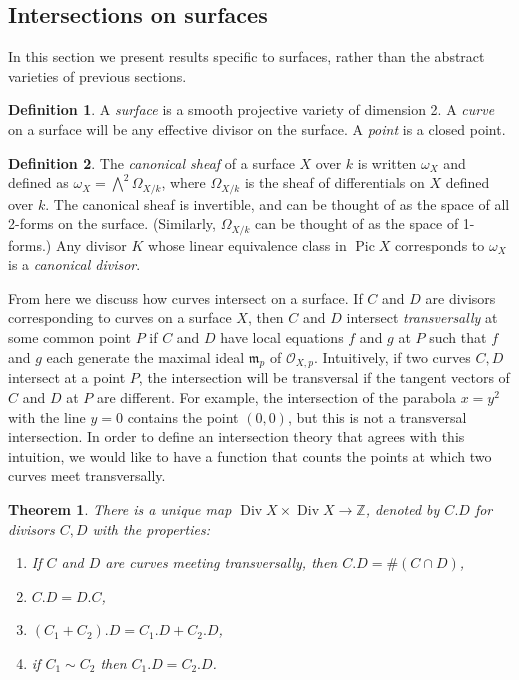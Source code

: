 \documentclass[12pt,twoside]{reedthesis}
\theoremstyle{plain}
\newtheorem{theorem}{Theorem}[chapter]
\theoremstyle{definition}
\newtheorem{definition}{Definition}[section]
\theoremstyle{remark}
\newcommand{\ZZ}{\mathbb{Z}}
\newcommand{\calO}{\mathcal{O}}
\newcommand{\Div}{\operatorname{Div}}
\newcommand{\Pic}{\operatorname{Pic}}
\begin{document}
\subsection{Intersections on surfaces}
In this section we present results specific to surfaces, rather than the abstract varieties of previous sections.
\begin{definition}
A \emph{surface} is a smooth projective variety of dimension 2. A \emph{curve} on a surface will be any effective divisor on the surface. A \emph{point} is a closed point.
\end{definition}
\begin{definition}
The \emph{canonical sheaf} of a surface $X$ over $k$ is written $\omega_X$ and defined as $\omega_X=\bigwedge^2\Omega_{X/k}$, where $\Omega_{X/k}$ is the sheaf of differentials on $X$ defined over $k$. The canonical sheaf is invertible, and can be thought of as the space of all 2-forms on the surface. (Similarly, $\Omega_{X/k}$ can be thought of as the space of 1-forms.) Any divisor $K$ whose linear equivalence class in $\Pic X$ corresponds to $\omega_X$ is a \emph{canonical divisor}.
\end{definition}
From here we discuss how curves intersect on a surface. If $C$ and $D$ are divisors corresponding to curves on a surface $X$, then $C$ and $D$ intersect \emph{transversally} at some common point $P$ if $C$ and $D$ have local equations $f$ and $g$ at $P$ such that $f$ and $g$ each generate the maximal ideal $\mathfrak{m}_p$ of $\calO_{X,p}$. Intuitively, if two curves $C,D$ intersect at a point $P$, the intersection will be transversal if the tangent vectors of $C$ and $D$ at $P$ are different. For example, the intersection of the parabola $x=y^2$ with the line $y=0$ contains the point $(0,0)$, but this is not a transversal intersection. In order to define an intersection theory that agrees with this intuition, we would like to have a function that counts the points at which two curves meet transversally.
\begin{theorem}
There is a unique map $\Div X\times \Div X\to\ZZ$, denoted by $C.D$ for divisors $C,D$ with the properties:
\begin{enumerate}
\item If $C$ and $D$ are curves meeting transversally, then $C.D=\#(C\cap D)$,
\item $C.D=D.C$,
\item $(C_1+C_2).D=C_1.D+C_2.D$,
\item if $C_1\sim C_2$ then $C_1.D=C_2.D$.
\end{enumerate}
\end{theorem}
\end{document}
